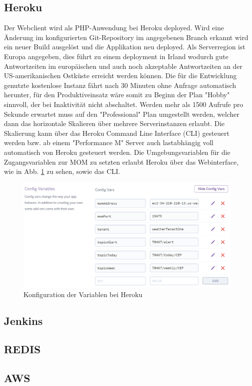 \subsection{Heroku}\label{Heroku}
Der Webclient wird als PHP-Anwendung bei Heroku deployed. Wird eine Änderung im konfigurierten Git-Repository  im angegebenen Branch erkannt wird ein neuer Build ausgelöst und die Applikation neu deployed. Als Serverregion ist Europa angegeben, dies führt zu einem deployment in Irland wodurch gute Antwortzeiten im europäischen und auch noch akzeptable Antwortzeiten an der US-amerikanischen Ostküste erreicht werden können. Die für die Entwicklung genutzte kostenlose Instanz fährt nach 30 Minuten ohne Anfrage automatisch herunter, für den Produktiveinsatz wäre somit zu Beginn der Plan "Hobby" sinnvoll, der bei Inaktivität nicht abschaltet. Werden mehr als 1500 Aufrufe pro Sekunde erwartet muss auf den "Professional" Plan umgestellt werden, welcher dann das horizontale Skalieren über mehrere Serverinstanzen erlaubt. Die Skalierung kann über das Heroku Command Line Interface (CLI) gesteuert werden bzw. ab einem "Performance M" Server auch lastabhängig voll automatisch von Heroku gesteuert werden. Die Umgebungsvariablen für die Zugangsvariablen zur MOM zu setzten erlaubt Heroku über das Webinterface, wie in Abb. \ref{img:herokuConf} zu sehen, sowie das CLI.
\begin{figure}[htbp]
	\centering
	\includegraphics[width=1.0\textwidth]{Bilder/Web-herokuEnv.PNG}
	\caption{Konfiguration der Variablen bei Heroku}
	\label{img:herokuConf}
\end{figure} 

\subsection{Jenkins}\label{Jenkins}
\subsection{REDIS}
\subsection{AWS}